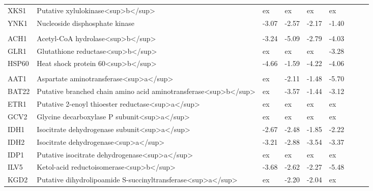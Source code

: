 \begin{ThreePartTable}
\begin{longtable}[t]{lllllllll}
\hspace{1em}XKS1 & Putative xylulokinase<sup>b</sup> & ex & ex & ex & ex &  &  & \\
\hspace{1em}YNK1 & Nucleoside disphosphate kinase & -3.07 & -2.57 & -2.17 & -1.40 &  &  & \\
\addlinespace[0.3em]
\multicolumn{9}{l}{\textbf{Cytosol and mitochondria}}\\
\hspace{1em}ACH1 & Acetyl-CoA hydrolase<sup>b</sup> & -3.24 & -5.09 & -2.79 & -4.03 &  &  & \\
\hspace{1em}GLR1 & Glutathione reductase<sup>b</sup> & ex & ex & ex & -3.28 &  &  & \\
\hspace{1em}HSP60 & Heat shock protein 60<sup>b</sup> & -4.66 & -1.59 & -4.22 & -4.06 &  &  & \\
\addlinespace[0.3em]
\multicolumn{9}{l}{\textbf{Mitochondria}}\\
\hspace{1em}AAT1 & Aspartate aminotransferase<sup>a</sup> & ex & -2.11 & -1.48 & -5.70 &  &  & \\
\hspace{1em}BAT22 & Putative branched chain amino acid aminotransferase<sup>b</sup> & ex & -3.57 & -1.44 & -3.12 &  &  & \\
\hspace{1em}ETR1 & Putative 2-enoyl thioester reductase<sup>a</sup> & ex & ex & ex & ex &  &  & \\
\hspace{1em}GCV2 & Glycine decarboxylase P subunit<sup>a</sup> & ex & ex & ex & ex &  &  & \\
\hspace{1em}IDH1 & Isocitrate dehydrogenase subunit<sup>a</sup> & -2.67 & -2.48 & -1.85 & -2.22 &  &  & \\
\hspace{1em}IDH2 & Isocitrate dehydrogenase<sup>a</sup> & -3.21 & -2.88 & -3.54 & -3.37 &  &  & \\
\hspace{1em}IDP1 & Putative isocitrate dehydrogenase<sup>a</sup> & ex & ex & ex & ex &  &  & \\
\hspace{1em}ILV5 & Ketol-acid reductoisomerase<sup>b</sup> & -3.68 & -2.62 & -2.27 & -5.48 &  &  & \\
\hspace{1em}KGD2 & Putative dihydrolipoamide S-succinyltransferase<sup>a</sup> & ex & -2.20 & -2.04 & ex &  &  & \\

\end{longtable}
\end{ThreePartTable}
